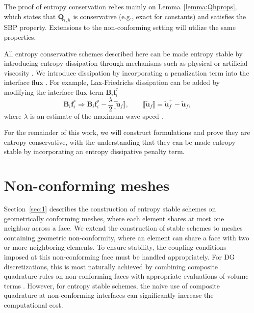 \documentclass{svjour3}                     %
\renewcommand{\tilde}{\widetilde}
\newcommand{\LRp}[1]{\left( #1 \right)}
\newcommand{\jump}[1] {\ensuremath{\llbracket#1\rrbracket}}
\begin{document}
The proof of entropy conservation relies mainly on Lemma~\ref{lemma:Qhprops}, which states that $\bm{Q}_{i,h}$ is conservative (e.g., exact for constants) and satisfies the SBP property.  Extensions to the non-conforming setting will utilize the same properties.  

All entropy conservative schemes described here can be made entropy stable by introducing entropy dissipation through mechanisms such as physical or artificial viscosity \cite{tadmor2006entropy,upperman2019entropy}.  We introduce dissipation by incorporating a penalization term into the interface flux \cite{winters2017uniquely}.  For example, Lax-Friedrichs dissipation can be added by modifying the interface flux term $\bm{B}_i\bm{f}^*_i$ 
\[
\bm{B}_i\bm{f}^*_i \Longrightarrow \bm{B}_i\bm{f}^*_i - \frac{\lambda}{2} \jump{\tilde{\bm{u}}_f}, \qquad  \jump{\tilde{\bm{u}}_f} = \tilde{\bm{u}}_f^+ - \tilde{\bm{u}}_f,
\]
where $\lambda$ is an estimate of the maximum wave speed \cite{chen2017entropy, chan2017discretely}.  

For the remainder of this work, we will construct formulations and prove they are entropy conservative, with the understanding that they can be made entropy stable by incorporating an entropy dissipative penalty term.  


\section{Non-conforming meshes}
\label{sec:2}

Section~\ref{sec:1} describes the construction of entropy stable schemes on geometrically conforming meshes, where each element shares at most one neighbor across a face.  We extend the construction of stable schemes to meshes containing geometric non-conformity, where an element can share a face with two or more neighboring elements.  To ensure stability, the coupling conditions imposed at this non-conforming face must be handled appropriately.  For DG discretizations, this is most naturally achieved by combining composite quadrature rules on non-conforming faces with appropriate evaluations of volume terms \cite{kozdon2018energy}.  However, for entropy stable schemes, the naive use of composite quadrature at non-conforming interfaces can significantly increase the computational cost.
\end{document}

